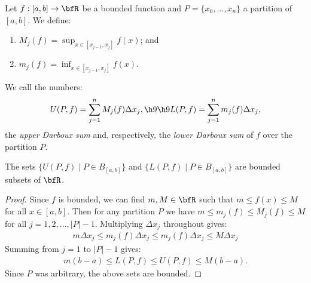 \documentclass[10pt,twoside,openany]{memoir}
\begin{document}
    \begin{definition}
        Let $f:[a,b] \rightarrow \bfR$ be a bounded function and $P=\{x_0,...,x_n\}$ a partition of $[a,b]$. We define:
            \begin{enumerate}[label = (\arabic*),itemsep=1pt,topsep=3pt]
                \item $M_j(f) = \sup_{x \in [x_{j-1},x_j]}f(x)$; and
                \item $m_j(f) = \inf_{x \in [x_{j-1},x_j]}f(x)$.
            \end{enumerate}
        We call the numbers:
            \begin{equation*}
            \begin{split}
                U(P,f) = \sum_{j = 1}^n M_j(f)\Delta x_j, \h9\h9 L(P,f) = \sum_{j = 1}^n m_j(f)\Delta x_j, 
            \end{split}
            \end{equation*}
        the \textit{upper Darboux sum} and, respectively, the \textit{lower Darboux sum} of $f$ over the partition $P$.
    \end{definition}

    \iffalse
    Since $f$ is defined on all of $[a,b]$, it is not necessary that we define $M_j(f)$ strictly between the partition which it was defined. It is sufficient to consider the closed set $[x_{j-1},x_j]$.
    \fi

    \begin{proposition}
        The sets $\{U(P,f) \mid P \in B_{[a,b]}\}$ and $\{L(P,f) \mid P \in B_{[a,b]}\}$ are bounded subsets of $\bfR$.
    \end{proposition}
        \begin{proof}
            Since $f$ is bounded, we can find $m,M \in \bfR$ such that $m  \leq f(x) \leq M$ for all $x \in [a,b]$. Then for any partition $P$ we have $m \leq m_j(f) \leq M_j(f) \leq M$ for all $j = 1,2,...,|P|-1$. Multiplying $\Delta x_j$ throughout gives:
                \begin{equation*}
                \begin{split}
                    m \Delta x_j \leq  m_j(f)\Delta x_j \leq m_j(f)\Delta x_j \leq M\Delta x_j
                \end{split}
                \end{equation*}
            Summing from $j = 1$ to $|P|-1$ gives:
                \begin{equation*}
                \begin{split}
                    m (b-a) \leq  L(P,f) \leq U(P,f)\leq M(b-a).
                \end{split}
                \end{equation*}
            Since $P$ was arbitrary, the above sets are bounded.
        \end{proof}
\end{document}
